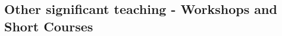 \documentclass[11pt,letterpaper,pdf]{article}
\newcommand{\teach}[3]{%
  \vspace*{0.3\baselineskip}
  {#1}.\newline {\it #3}. #2.}
\begin{document}
\subsection*{Other significant teaching - Workshops and Short Courses}

%
%
%
%
%
%
%
%




\end{document}
